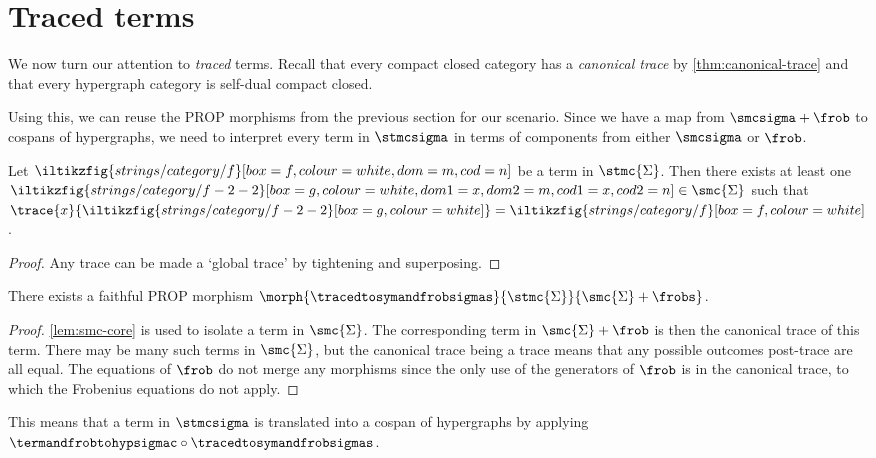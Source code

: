 \section{Traced terms}

We now turn our attention to \emph{traced} terms.
Recall that every compact closed category has a \emph{canonical trace} by
\cref{thm:canonical-trace}
and that every hypergraph category is self-dual
compact closed.


Using this, we can reuse the PROP morphisms from the previous section for our
scenario.
Since we have a map from \(\smcsigma + \frob\) to cospans of hypergraphs, we
need to interpret every term in \(\stmcsigma\) in terms of components from
either \(\smcsigma\) or \(\frob\).

\begin{lemma}\label{lem:smc-core}
    Let \(\iltikzfig{strings/category/f}[box=f,colour=white,dom=m,cod=n]\) be a
    term in \(\stmc{\Sigma}\).
    Then there exists at least one \(
        \iltikzfig{strings/category/f-2-2}[box=g,colour=white,dom1=x,dom2=m,cod1=x,cod2=n]
        \in \smc{\Sigma}
    \) such that \(
        \trace{x}{\iltikzfig{strings/category/f-2-2}[box=g, colour=white]}
        =
        \iltikzfig{strings/category/f}[box=f,colour=white]
    \).
\end{lemma}
\begin{proof}
    Any trace can be made a `global trace' by tightening and superposing.
\end{proof}

\begin{proposition}
    There exists a faithful PROP morphism \(
        \morph{\tracedtosymandfrobsigmas}{\stmc{\Sigma}}{\smc{\Sigma} + \frobs}
    \).
\end{proposition}
\begin{proof}
    \cref{lem:smc-core} is used to isolate a term in \(\smc{\Sigma}\).
    The corresponding term in \(\smc{\Sigma} + \frob\) is then the canonical
    trace of this term.
    There may be many such terms in \(\smc{\Sigma}\), but the canonical trace
    being a trace means that any possible outcomes post-trace are all equal.
    The equations of \(\frob\) do not merge any morphisms
    since the only use of the generators of \(\frob\) is in the canonical trace,
    to which the Frobenius equations do not apply.
\end{proof}

This means that a term in \(\stmcsigma\) is translated into a cospan of
hypergraphs by applying
\(\termandfrobtohypsigmac \circ \tracedtosymandfrobsigmas\).

